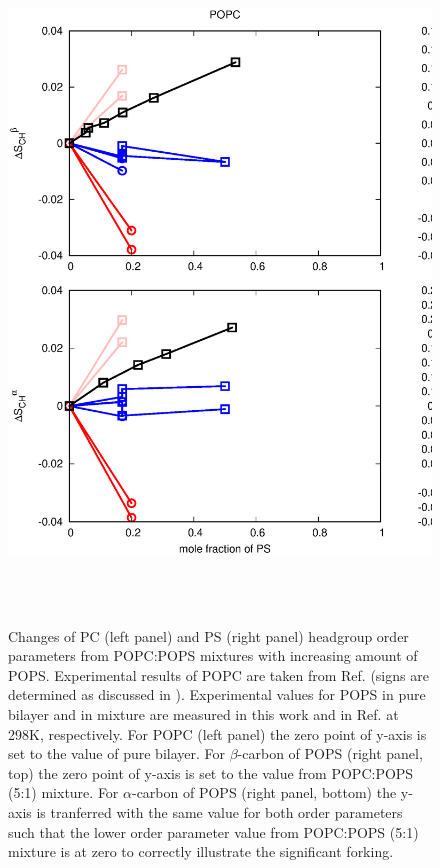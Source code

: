 \documentclass[aps,prl,superscriptaddress,twocolumn]{revtex4}
\begin{document}
\begin{figure}[]
  \centering
  \includegraphics[width=16.0cm]{../Figs/HGorderparametersPCvsPS.eps}
  \caption{\label{HGorderparametersPCvsPS}
    Changes of PC (left panel) and PS (right panel) headgroup order parameters
    from POPC:POPS mixtures with increasing amount of POPS.
    Experimental results of POPC are taken from Ref. 
    (signs are determined as discussed in \cite{botan15,ollila16}).
    Experimental values for POPS in pure bilayer and in mixture are  
    measured in this work and in Ref.  at 298K, respectively.
    For POPC (left panel) the zero point of y-axis is set to the value of pure bilayer.
    For $\beta$-carbon of POPS (right panel, top) the zero point of y-axis is
    set to the value from POPC:POPS (5:1) mixture.
    For $\alpha$-carbon of POPS (right panel, bottom) the y-axis is tranferred
    with the same value for both order parameters such that the lower order
    parameter value from POPC:POPS (5:1) mixture is at zero
    to correctly illustrate the significant forking.
  }
   \\
   \\
\end{figure}
\end{document}
